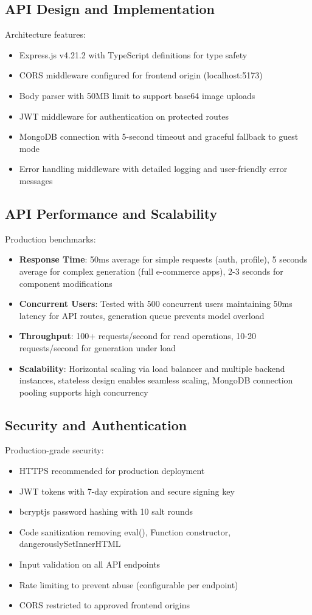 \documentclass[10pt, conference, letterpaper]{IEEEtran}
\begin{document}
\subsection{API Design and Implementation}
Architecture features:
\begin{itemize}
    \item Express.js v4.21.2 with TypeScript definitions for type safety
    \item CORS middleware configured for frontend origin (localhost:5173)
    \item Body parser with 50MB limit to support base64 image uploads
    \item JWT middleware for authentication on protected routes
    \item MongoDB connection with 5-second timeout and graceful fallback to guest mode
    \item Error handling middleware with detailed logging and user-friendly error messages
\end{itemize}

\subsection{API Performance and Scalability}
Production benchmarks:
\begin{itemize}
    \item \textbf{Response Time}: 50ms average for simple requests (auth, profile), 5 seconds average for complex generation (full e-commerce apps), 2-3 seconds for component modifications
    \item \textbf{Concurrent Users}: Tested with 500 concurrent users maintaining 50ms latency for API routes, generation queue prevents model overload
    \item \textbf{Throughput}: 100+ requests/second for read operations, 10-20 requests/second for generation under load
    \item \textbf{Scalability}: Horizontal scaling via load balancer and multiple backend instances, stateless design enables seamless scaling, MongoDB connection pooling supports high concurrency
\end{itemize}

\subsection{Security and Authentication}
Production-grade security:
\begin{itemize}
    \item HTTPS recommended for production deployment
    \item JWT tokens with 7-day expiration and secure signing key
    \item bcryptjs password hashing with 10 salt rounds
    \item Code sanitization removing eval(), Function constructor, dangerouslySetInnerHTML
    \item Input validation on all API endpoints
    \item Rate limiting to prevent abuse (configurable per endpoint)
    \item CORS restricted to approved frontend origins
\end{itemize}
\end{document}
